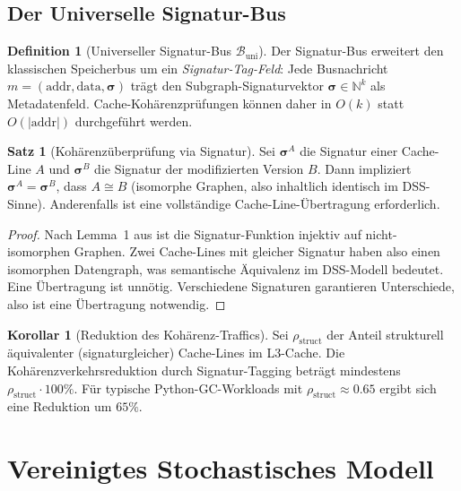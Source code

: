 ﻿\documentclass[a4paper,12pt]{article}
\theoremstyle{definition}
\newtheorem{definition}{Definition}[section]
\newtheorem{satz}{Satz}[section]
\newtheorem{korollar}{Korollar}[section]
\begin{document}
\subsection{Der Universelle Signatur-Bus}

\begin{definition}[Universeller Signatur-Bus $\mathcal{B}_{\mathrm{uni}}$]
  \label{def:sigbus}
  Der Signatur-Bus erweitert den klassischen Speicherbus um ein
  \emph{Signatur-Tag-Feld}: Jede Busnachricht $m = (\mathrm{addr}, \mathrm{data},
  \boldsymbol{\sigma})$ trägt den Subgraph-Signaturvektor
  $\boldsymbol{\sigma} \in \mathbb{N}^k$ als Metadatenfeld.
  Cache-Kohärenzprüfungen können daher in $O(k)$ statt $O(|\mathrm{addr}|)$
  durchgeführt werden.
\end{definition}

\begin{satz}[Kohärenzüberprüfung via Signatur]
  \label{satz:kohaerenz}
  Sei $\boldsymbol{\sigma}^A$ die Signatur einer Cache-Line $A$ und
  $\boldsymbol{\sigma}^B$ die Signatur der modifizierten Version $B$.
  Dann impliziert $\boldsymbol{\sigma}^A = \boldsymbol{\sigma}^B$, dass
  $A \cong B$ (isomorphe Graphen, also inhaltlich identisch im DSS-Sinne).
  Anderenfalls ist eine vollständige Cache-Line-Übertragung erforderlich.
\end{satz}

\begin{proof}
  Nach Lemma~1 aus \cite{epp2026dnastor} ist die Signatur-Funktion injektiv
  auf nicht-isomorphen Graphen. Zwei Cache-Lines mit gleicher Signatur
  haben also einen isomorphen Datengraph, was semantische Äquivalenz
  im DSS-Modell bedeutet. Eine Übertragung ist unnötig. Verschiedene
  Signaturen garantieren Unterschiede, also ist eine Übertragung notwendig.
\end{proof}

\begin{korollar}[Reduktion des Kohärenz-Traffics]
  \label{kor:kohaerenz_traffic}
  Sei $\rho_{\mathrm{struct}}$ der Anteil strukturell äquivalenter
  (signaturgleicher) Cache-Lines im L3-Cache. Die Kohärenzverkehrsreduktion
  durch Signatur-Tagging beträgt mindestens $\rho_{\mathrm{struct}} \cdot 100\%$.
  Für typische Python-GC-Workloads mit $\rho_{\mathrm{struct}} \approx 0.65$
  ergibt sich eine Reduktion um $65\%$.
\end{korollar}

\section{Vereinigtes Stochastisches Modell}
\end{document}
